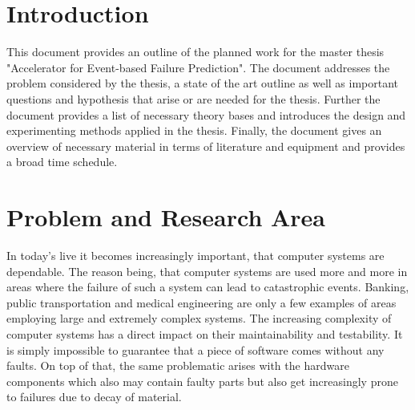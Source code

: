 \documentclass[12pt]{article} %
\begin{document}

\tableofcontents %

\newpage %


\section{Introduction} %

This document provides an outline of the planned work for the master thesis
"Accelerator for Event-based Failure Prediction". The document addresses the
problem considered by the thesis, a state of the art outline as well as
important questions and hypothesis that arise or are needed for the thesis.
Further the document provides a list of necessary theory bases and introduces
the design and experimenting methods applied in the thesis. Finally, the
document gives an overview of necessary material in terms of literature and
equipment and provides a broad time
schedule.


\section{Problem and Research Area} %

In today's live it becomes increasingly important, that computer systems are
dependable. The reason being, that computer systems are used more and more in
areas where the failure of such a system can lead to catastrophic events.
Banking, public transportation and medical engineering are only a few examples
of areas employing large and extremely complex systems. The increasing
complexity of computer systems has a direct impact on their maintainability and
testability. It is simply impossible to guarantee that a piece of software comes
without any faults. On top of that, the same problematic arises with the
hardware components which also may contain faulty parts but also get
increasingly prone to failures due to decay of material.
\end{document}
